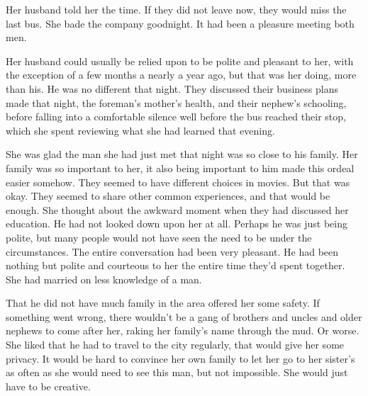 \documentclass{article}
\begin{document}
Her husband told her the time. If they did not leave now, they would miss the last bus. She bade the company goodnight. It had been a pleasure meeting both men. 

Her husband could usually be relied upon to be polite and pleasant to her, with the exception of a few months a nearly a year ago, but that was her doing, more than his. He was no different that night. They discussed their business plans made that night, the foreman's mother's health, and their nephew's schooling, before falling into a comfortable silence well before the bus reached their stop, which she spent reviewing what she had learned that evening.

She was glad the man she had just met that night was so close to his family. Her family was so important to her, it also being important to him made this ordeal easier somehow. They seemed to have different choices in movies. But that was okay. They seemed to share other common experiences, and that would be enough. She thought about the awkward moment when they had discussed her education. He had not looked down upon her at all. Perhaps he was just being polite, but many people would not have seen the need to be under the circumstances. The entire conversation had been very pleasant. He had been nothing but polite and courteous to her the entire time they'd spent together. She had married on less knowledge of a man.

That he did not have much family in the area offered her some safety. If something went wrong, there wouldn't be a gang of brothers and uncles and older nephews to come after her, raking her family's name through the mud. Or worse. She liked that he had to travel to the city regularly, that would give her some privacy. It would be hard to convince her own family to let her go to her sister's as often as she would need to see this man, but not impossible. She would just have to be creative. 
\end{document}
